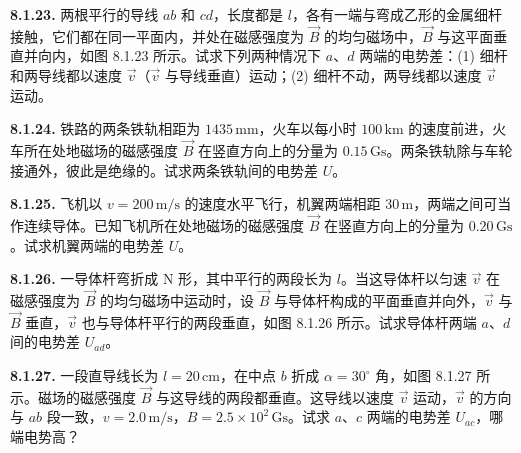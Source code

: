 \vfill
\newpage

\textbf{8.1.23.} 两根平行的导线 $ab$ 和 $cd$，长度都是 $l$，各有一端与弯成乙形的金属细杆接触，它们都在同一平面内，并处在磁感强度为 $\vec{B}$ 的均匀磁场中，$\vec{B}$ 与这平面垂直并向内，如图 8.1.23 所示。试求下列两种情况下 $a$、$d$ 两端的电势差：(1) 细杆和两导线都以速度 $\vec{v}$（$\vec{v}$ 与导线垂直）运动；(2) 细杆不动，两导线都以速度 $\vec{v}$ 运动。

\begin{center}
\end{center}

\vfill
\newpage

\textbf{8.1.24.} 铁路的两条铁轨相距为 $1435\,\mathrm{mm}$，火车以每小时 $100\,\mathrm{km}$ 的速度前进，火车所在处地磁场的磁感强度 $\vec{B}$ 在竖直方向上的分量为 $0.15\,\mathrm{Gs}$。两条铁轨除与车轮接通外，彼此是绝缘的。试求两条铁轨间的电势差 $U$。

\vfill
\newpage

\textbf{8.1.25.} 飞机以 $v = 200\,\mathrm{m/s}$ 的速度水平飞行，机翼两端相距 $30\,\mathrm{m}$，两端之间可当作连续导体。已知飞机所在处地磁场的磁感强度 $\vec{B}$ 在竖直方向上的分量为 $0.20\,\mathrm{Gs}$。试求机翼两端的电势差 $U$。

\vfill
\newpage

\textbf{8.1.26.} 一导体杆弯折成 $\mathrm{N}$ 形，其中平行的两段长为 $l$。当这导体杆以匀速 $\vec{v}$ 在磁感强度为 $\vec{B}$ 的均匀磁场中运动时，设 $\vec{B}$ 与导体杆构成的平面垂直并向外，$\vec{v}$ 与 $\vec{B}$ 垂直，$\vec{v}$ 也与导体杆平行的两段垂直，如图 8.1.26 所示。试求导体杆两端 $a$、$d$ 间的电势差 $U_{ad}$。

\begin{center}
\end{center}

\vfill
\newpage

\textbf{8.1.27.} 一段直导线长为 $l = 20\,\mathrm{cm}$，在中点 $b$ 折成 $\alpha = 30^{\circ}$ 角，如图 8.1.27 所示。磁场的磁感强度 $\vec{B}$ 与这导线的两段都垂直。这导线以速度 $\vec{v}$ 运动，$\vec{v}$ 的方向与 $ab$ 段一致，$v = 2.0\,\mathrm{m/s}$，$B = 2.5 \times 10^{2}\,\mathrm{Gs}$。试求 $a$、$c$ 两端的电势差 $U_{ac}$，哪端电势高？

\begin{center}
\end{center}

\vfill
\newpage

